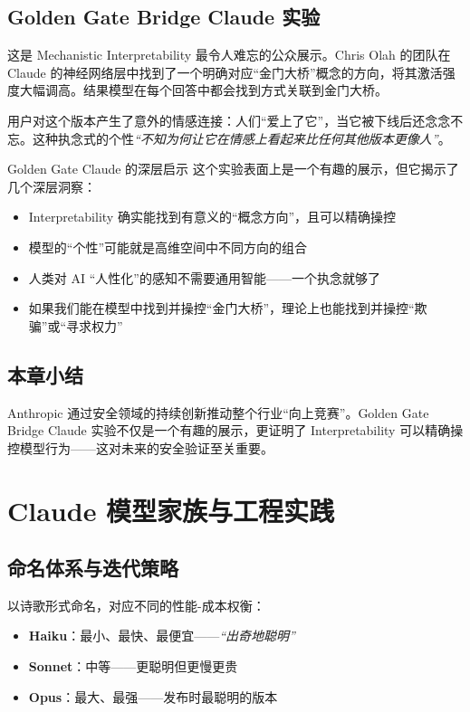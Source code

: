 \documentclass[a4paper]{article}
\begin{document}
\subsection{Golden Gate Bridge Claude 实验}

这是 Mechanistic Interpretability 最令人难忘的公众展示。Chris Olah 的团队在 Claude 的神经网络层中找到了一个明确对应``金门大桥''概念的方向，将其激活强度大幅调高。结果模型在每个回答中都会找到方式关联到金门大桥。

用户对这个版本产生了意外的情感连接：人们``爱上了它''，当它被下线后还念念不忘。这种执念式的个性\textit{``不知为何让它在情感上看起来比任何其他版本更像人''}。

\begin{knowledgebox}{Golden Gate Claude 的深层启示}
这个实验表面上是一个有趣的展示，但它揭示了几个深层洞察：
\begin{itemize}
    \item Interpretability 确实能找到有意义的``概念方向''，且可以精确操控
    \item 模型的``个性''可能就是高维空间中不同方向的组合
    \item 人类对 AI ``人性化''的感知不需要通用智能——一个执念就够了
    \item 如果我们能在模型中找到并操控``金门大桥''，理论上也能找到并操控``欺骗''或``寻求权力''
\end{itemize}
\end{knowledgebox}

\subsection{本章小结}

Anthropic 通过安全领域的持续创新推动整个行业``向上竞赛''。Golden Gate Bridge Claude 实验不仅是一个有趣的展示，更证明了 Interpretability 可以精确操控模型行为——这对未来的安全验证至关重要。

\section{Claude 模型家族与工程实践}

\subsection{命名体系与迭代策略}

以诗歌形式命名，对应不同的性能-成本权衡：
\begin{itemize}
    \item \textbf{Haiku}：最小、最快、最便宜——\textit{``出奇地聪明''}
    \item \textbf{Sonnet}：中等——更聪明但更慢更贵
    \item \textbf{Opus}：最大、最强——发布时最聪明的版本
\end{itemize}
\end{document}
